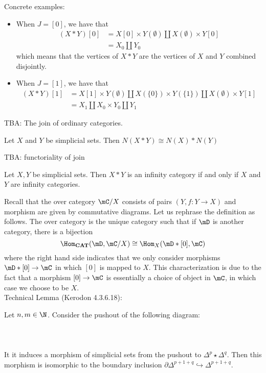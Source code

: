 \documentclass[a4paper]{article}
\begin{document}
Concrete examples: 
\begin{itemize}
\item When $J=[0]$, we have that 
\begin{align*}
(X\ast Y)[0]&=X[0]\times Y(\emptyset)\amalg X(\emptyset)\times Y[0]\\
&=X_0\amalg Y_0
\end{align*}
which means that the vertices of $X\ast Y$ are the vertices of $X$ and $Y$ combined disjointly. 
\item When $J=[1]$, we have that 
\begin{align*}
(X\ast Y)[1]&=X[1]\times Y(\emptyset)\amalg X(\{0\})\times Y(\{1\}) \amalg X(\emptyset)\times Y[1]\\
&=X_1\amalg X_0\times Y_0\amalg Y_1
\end{align*}
\end{itemize}

TBA: The join of ordinary categories. 

\begin{lmm}{}{} Let $X$ and $Y$ be simplicial sets. Then $N(X\ast Y)\cong N(X)\ast N(Y)$
\end{lmm}

TBA: functoriality of join

\begin{prp}{}{} Let $X,Y$ be simplicial sets. Then $X\ast Y$ is an infinity category if and only if $X$ and $Y$ are infinity categories. 
\end{prp}

Recall that the over category $\mC/X$ consists of pairs $(Y,f:Y\to X)$ and morphism are given by commutative diagrams. Let us rephrase the definition as follows. The over category is the unique category such that if $\mD$ is another category, there is a bijection $$\Hom_\bold{CAT}(\mD,\mC/X)\cong\Hom_X(\mD\ast[0],\mC)$$ where the right hand side indicates that we only consider morphisms $\mD\ast[0]\to\mC$ in which $[0]$ is mapped to $X$. This characterization is due to the fact that a morphism $[0]\to\mC$ is essentially a choice of object in $\mC$, in which case we choose to be $X$. \\

Technical Lemma (Kerodon 4.3.6.18): 

\begin{prp}{}{} Let $n,m\in\N$. Consider the pushout of the following diagram: \\~\\
\\~\\
It it induces a morphism of simplicial sets from the pushout to $\Delta^p\star\Delta^q$. Then this morphism is isomorphic to the boundary inclusion $\partial\Delta^{p+1+q}\hookrightarrow\Delta^{p+1+q}$. 
\end{prp}
\end{document}
